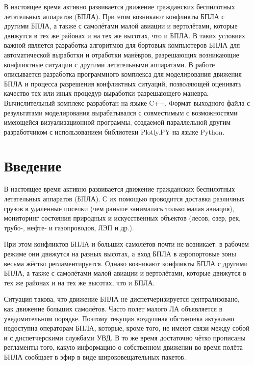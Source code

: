 \documentclass[a4paper,12pt]{article}
\begin{document}
\bigskip

\noindent
В настоящее время активно развивается движение гражданских беспилотных летательных аппаратов (БПЛА). При этом возникают конфликты БПЛА с другими БПЛА, а также с самолётами малой авиации и вертолётами, которые движутся в тех же районах и на тех же высотах, что и БПЛА. В таких условиях важной является разработка алгоритмов для бортовых компьютеров БПЛА для автоматической выработки и отработки манёвров, разрешающих возникающие конфликтные ситуации с другими летательными аппаратами. В работе описывается разработка программного комплекса для моделирования движения БПЛА и процесса разрешения конфликтных ситуаций, позволяющей оценивать качество тех или иных процедур выработки разрешающего маневра. Вычислительный комплекс разработан на языке C++. Формат выходного файла с результатами моделирования вырабатывался с совместимым с возможностями имеющейся визуализационной программы, создаемой параллельной другим разработчиком с использованием библиотеки Plotly.PY на языке Python. 
  

\newpage
\setcounter{page}{2}
\tableofcontents
\newpage

\newpage
\section*{Введение}

В настоящее время активно развивается движение гражданских беспилотных летательных аппаратов (БПЛА). С их помощью проводится доставка различных грузов в удаленные поселки (чем раньше занималась только малая авиация), мониторинг состояния природных и искусственных объектов (лесов, озер, рек, трубо-, нефте- и газопроводов, ЛЭП и др.).

При этом конфликтов БПЛА и больших самолётов почти не возникает: в рабочем режиме они движутся на разных высотах, а вход БПЛА в аэропортовые зоны весьма жёстко регламентируется. Однако возникают конфликты БПЛА  с другими БПЛА, а также с самолётами малой авиации и вертолётами, которые движутся в тех же районах и на тех же высотах, что и БПЛА. 

Ситуация такова, что движение БПЛА не диспетчеризируется централизовано, как движение больших самолётов. Часто полет малого ЛА объявляется в уведомительном порядке. Поэтому текущая воздушная обстановка актуально недоступна операторам БПЛА, которые, кроме того, не имеют связи между собой и с диспетчерскими службами УВД. В то же время достаточно чётко прописаны регламенты того, какую информацию о собственном движении во время полёта БПЛА сообщает в эфир в виде широковещательных пакетов.
\end{document}
